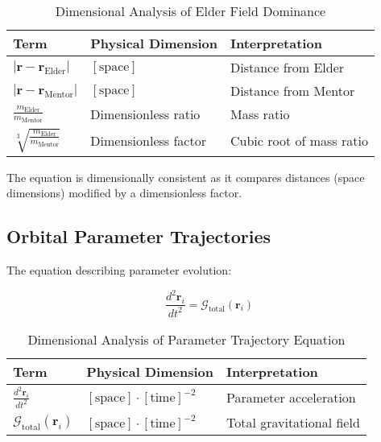 \begin{table}[h]
\centering
\caption{Dimensional Analysis of Elder Field Dominance}
\label{tab:dimensional_analysis_elder_dominance}
\begin{tabular}{p{4cm} p{4cm} p{6cm}}
\textbf{Term} & \textbf{Physical Dimension} & \textbf{Interpretation} \\
\hline
$|\mathbf{r} - \mathbf{r}_{\text{Elder}}|$ & $[\text{space}]$ & Distance from Elder \\
$|\mathbf{r} - \mathbf{r}_{\text{Mentor}}|$ & $[\text{space}]$ & Distance from Mentor \\
$\frac{m_{\text{Elder}}}{m_{\text{Mentor}}}$ & Dimensionless ratio & Mass ratio \\
$\sqrt[3]{\frac{m_{\text{Elder}}}{m_{\text{Mentor}}}}$ & Dimensionless factor & Cubic root of mass ratio \\
\hline
\end{tabular}
\end{table}

The equation is dimensionally consistent as it compares distances (space dimensions) modified by a dimensionless factor.

\subsection{Orbital Parameter Trajectories}

The equation describing parameter evolution:

\begin{equation}
\frac{d^2\mathbf{r}_i}{dt^2} = \mathcal{G}_{\text{total}}(\mathbf{r}_i)
\end{equation}

\begin{table}[h]
\centering
\caption{Dimensional Analysis of Parameter Trajectory Equation}
\label{tab:dimensional_analysis_parameter_trajectory}
\begin{tabular}{p{3cm} p{5cm} p{6cm}}
\textbf{Term} & \textbf{Physical Dimension} & \textbf{Interpretation} \\
\hline
$\frac{d^2\mathbf{r}_i}{dt^2}$ & $[\text{space}] \cdot [\text{time}]^{-2}$ & Parameter acceleration \\
$\mathcal{G}_{\text{total}}(\mathbf{r}_i)$ & $[\text{space}] \cdot [\text{time}]^{-2}$ & Total gravitational field \\
\hline
\end{tabular}
\end{table}

